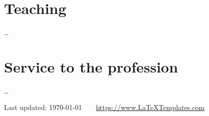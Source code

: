\documentclass[11pt]{article} %
\begin{document}

\section*{Teaching}

\ldots


\section*{Service to the profession}

\ldots

\vfill %


\begin{center}
	\scriptsize
	Last updated: \today~~\raisebox{-0.5pt}{\textbullet}~~\href{https://www.LaTeXTemplates.com}{https://www.LaTeXTemplates.com}
\end{center}

\fi
\end{document}
